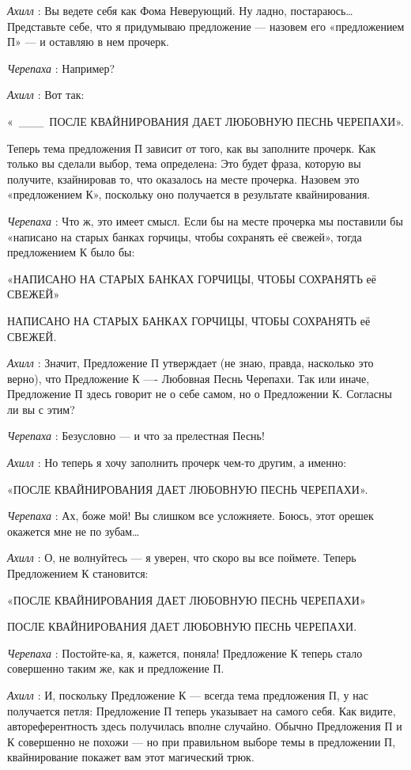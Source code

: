 \documentclass[../main.tex]{subfiles}
\begin{document}
\begin{dialogue}
\emph{Ахилл} : Вы ведете себя как Фома Неверующий. Ну ладно, постараюсь\ldots{} Представьте себе, что я придумываю предложение --- назовем его «предложением П» --- и оставляю в нем прочерк.

\emph{Черепаха} : Например?

\emph{Ахилл} : Вот так:

«~\_\_\_~ПОСЛЕ КВАЙНИРОВАНИЯ ДАЕТ ЛЮБОВНУЮ ПЕСНЬ ЧЕРЕПАХИ».

Теперь тема предложения П зависит от того, как вы заполните прочерк. Как только вы сделали выбор, тема определена: Это будет фраза, которую вы получите, кзайнировав то, что оказалось на месте прочерка. Назовем это «предложением К», поскольку оно получается в результате квайнирования.

\emph{Черепаха} : Что ж, это имеет смысл. Если бы на месте прочерка мы поставили бы «написано на старых банках горчицы, чтобы сохранять её свежей», тогда предложением К было бы:

«НАПИСАНО НА СТАРЫХ БАНКАХ ГОРЧИЦЫ, ЧТОБЫ СОХРАНЯТЬ её СВЕЖЕЙ»

НАПИСАНО НА СТАРЫХ БАНКАХ ГОРЧИЦЫ, ЧТОБЫ СОХРАНЯТЬ её СВЕЖЕЙ.

\emph{Ахилл} : Значит, Предложение П утверждает (не знаю, правда, насколько это верно), что Предложение К ---- Любовная Песнь Черепахи. Так или иначе, Предложение П здесь говорит не о себе самом, но о Предложении К. Согласны ли вы с этим?

\emph{Черепаха} : Безусловно --- и что за прелестная Песнь!

\emph{Ахилл} : Но теперь я хочу заполнить прочерк чем-то другим, а именно:

«ПОСЛЕ КВАЙНИРОВАНИЯ ДАЕТ ЛЮБОВНУЮ ПЕСНЬ ЧЕРЕПАХИ».

\emph{Черепаха} : Ах, боже мой! Вы слишком все усложняете. Боюсь, этот орешек окажется мне не по зубам\ldots{}

\emph{Ахилл} : О, не волнуйтесь --- я уверен, что скоро вы все поймете. Теперь Предложением К становится:

«ПОСЛЕ КВАЙНИРОВАНИЯ ДАЕТ ЛЮБОВНУЮ ПЕСНЬ ЧЕРЕПАХИ»

ПОСЛЕ КВАЙНИРОВАНИЯ ДАЕТ ЛЮБОВНУЮ ПЕСНЬ ЧЕРЕПАХИ.

\emph{Черепаха} : Постойте-ка, я, кажется, поняла! Предложение К теперь стало совершенно таким же, как и предложение П.

\emph{Ахилл} : И, поскольку Предложение К --- всегда тема предложения П, у нас получается петля: Предложение П теперь указывает на самого себя. Как видите, автореферентность здесь получилась вполне случайно. Обычно Предложения П и К совершенно не похожи --- но при правильном выборе темы в предложении П, квайнирование покажет вам этот магический трюк.


\end{dialogue}
\end{document}
